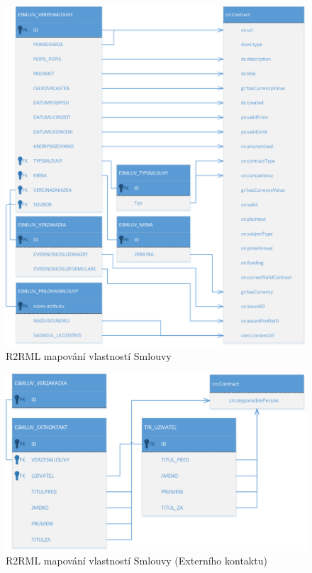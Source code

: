 \begin{figure}[H]
\centerline{\includegraphics[width=\textwidth]{img/mapContract.eps}}
\caption{R2RML mapování vlastností Smlouvy}
\label{obr:mapContract}
\end{figure}

\begin{figure}[H]
\centerline{\includegraphics[width=\textwidth]{img/mapRespPerson.eps}}
\caption{R2RML mapování vlastností Smlouvy (Externího kontaktu)}
\label{obr:mapRespPerson}
\end{figure}

